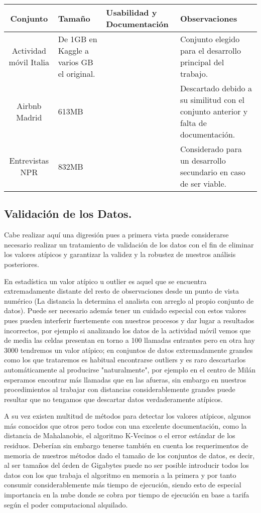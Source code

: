 \documentclass[11pt, a4paper]{article} %
\begin{document}
\begin{table}
  \centering
  \begin{tabular}{ | c | P{2cm} | P{3cm} | P{4cm} |}
    \hline
    Conjunto & Tamaño & Usabilidad y Documentación & Observaciones \\ \hline
    Actividad móvil Italia & De 1GB en Kaggle a varios GB el original. & \cite{italia} & Conjunto elegido para el desarrollo principal del trabajo. \\ \hline
    Airbnb Madrid & 613MB & \cite{airbnb} & Descartado debido a su similitud con el conjunto anterior y falta de documentación. \\ \hline
    Entrevistas NPR & 832MB & \cite{npr} & Considerado para un desarrollo secundario en caso de ser viable. \\
    \hline
  \end{tabular}
\end{table}
\newpage
\subsection{Validación de los Datos.}
Cabe realizar aquí una digresión pues a primera vista puede considerarse necesario realizar un tratamiento de validación de los datos con el fin de eliminar los valores atípicos y garantizar la validez y la robustez de nuestros análisis posteriores.


En estadística un valor atípico u outlier es aquel que se encuentra extremadamente distante del resto de observaciones desde un punto de vista numérico (La distancia la determina el analista con arreglo al propio conjunto de datos). Puede ser necesario además tener un cuidado especial con estos valores pues pueden interferir fuertemente con nuestros procesos y dar lugar a resultados incorrectos, por ejemplo si analizando los datos de la actividad móvil vemos que de media las celdas presentan en torno a 100 llamadas entrantes pero en otra hay 3000 tendremos un valor atípico; en conjuntos de datos extremadamente grandes como los que trataremos es habitual encontrarse outliers y es raro descartarlos automáticamente al producirse "naturalmente", por ejemplo en el centro de Milán esperamos encontrar más llamadas que en las afueras, sin embargo en nuestros procedimientos al trabajar con distancias considerablemente grandes puede resultar que no tengamos que descartar datos verdaderamente atípicos.


A su vez existen multitud de métodos para detectar los valores atípicos, algunos más conocidos que otros pero todos con una excelente documentación, como la distancia de Mahalanobis, el algoritmo K-Vecinos o el error estándar de los residuos. Deberían sin embargo tenerse también en cuenta los requerimentos de memoria de nuestros métodos dado el tamaño de los conjuntos de datos, es decir, al ser tamaños del órden de Gigabytes puede no ser posible introducir todos los datos con los que trabaja el algoritmo en memoria a la primera y por tanto consumir considerablemente más tiempo de ejecución, siendo esto de especial importancia en la nube donde se cobra por tiempo de ejecución en base a tarifa según el poder computacional alquilado.
\end{document}
